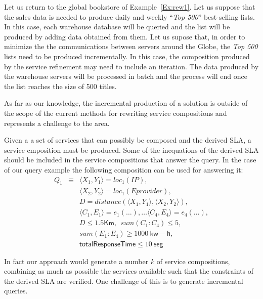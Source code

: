 \begin{example}\label{Ex:rew2}
Let us return to the global bookstore of Example~\ref{Ex:rew1}.
Let us suppose that the sales data is needed to produce daily and weekly ``\textit{Top 500}'' best-selling lists.
In this case, each warehouse database will be queried and the list will be produced by adding data obtained from them.
Let us supose that, in order to minimize the the communications between servers around the Globe, the \textit{Top 500} lists need to be produced incrementally.
In this case, the composition produced by the service refinement may need to include an iteration. The data produced by the warehouse servers will be processed in batch and the process will end once the list reaches the size of 500 titles.

As far as our knowledge, the incremental production of a solution is outside of the scope of the current methods for rewriting service compositions and represents a challenge to the area.
~\hfill\openbox
\end{example}


Given a a set of services that can possibly be composed and the derived SLA, a service cmposition must be produced.
Some of the inequations of the derived SLA should be included in the service compositions that answer the query.
In the case of our query example the following composition can be used for answering it:
\begin{eqnarray*}
Q_1 &\equiv&
   \langle X_1,Y_1\rangle = loc_1(IP), \\
&& \langle X_2,Y_2 \rangle = loc_1(Eprovider), \\
&& D = distance(\langle X_1,Y_1\rangle, \langle X_2,Y_2\rangle), \\
&& \langle C_1, E_1 \rangle = e_1(\dots), \dots \langle C_4, E_4 \rangle = e_4(\dots), \\
&& D \leq 1.5 \mathsf{Km},\ \ sum(C_1:C_4) \leq 5, \\
&& sum(E_1:E_4) \geq 1000\ \mathsf{kw-h}, \\
&& \mathsf{totalResponseTime}  \leq 10\ \mathsf{seg}
\end{eqnarray*}

  In fact our approach would generate a number $k$ of service compositions, combining as much as possible the services available such that the constraints of the derived SLA are verified. 
One challenge of this is to generate incremental queries.
 


